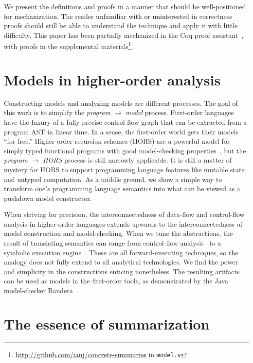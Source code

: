 We present the definitions and proofs in a manner that should be well-positioned for mechanization.
%
The reader unfamiliar with or uninterested in correctness proofs should still be able to understand the technique and apply it with little difficulty.
%
This paper has been partially mechanized in the Coq proof assistant~\citep{Filliâtre97thecoq}, with proofs in the supplemental materials\footnote{\url{http://github.com/ianj/concrete-summaries} in \texttt{model.v}}.

\section{Models in higher-order analysis}

Constructing models and analyzing models are different processes.
%
The goal of this work is to simplify the \textit{program} $\to$ \textit{model} process.
%
First-order languages have the luxury of a fully-precise control flow graph that can be extracted from a program AST in linear time.
%
In a sense, the first-order world gets their models ``for free.''
%
Higher-order recursion schemes (HORS) are a powerful model for simply typed functional programs with good model-checking properties~\citep{dvanhorn:Ong2006ModelChecking}, but the \textit{program} $\to$ \textit{HORS} process is still narrowly applicable.
%
It is still a matter of mystery for HORS to support programming language features like mutable state and untyped computation.
As a middle ground, we show a simple way to transform one's programming language semantics into what can be viewed as a pushdown model constructor.

When striving for precision, the interconnectedness of data-flow and control-flow analysis in higher-order languages extends upwards to the interconnectedness of model construction and model-checking.
%
When we tune the abstractions, the result of translating semantics can range from control-flow analysis~\citep{dvanhorn:VanHorn2010Abstracting} to a symbolic execution engine~\citep{dvanhorn:TobinHochstadt2012Higherorder}.
%
These are all forward-executing techniques, so the analogy does not fully extend to all analytical technologies.
%
We find the power and simplicity in the constructions enticing nonetheless.
%
The resulting artifacts can be used as models in the first-order tools, as demonstrated by the Java model-checker Bandera~\citep{ianjohnson:bandera}.

\section{The essence of summarization}

